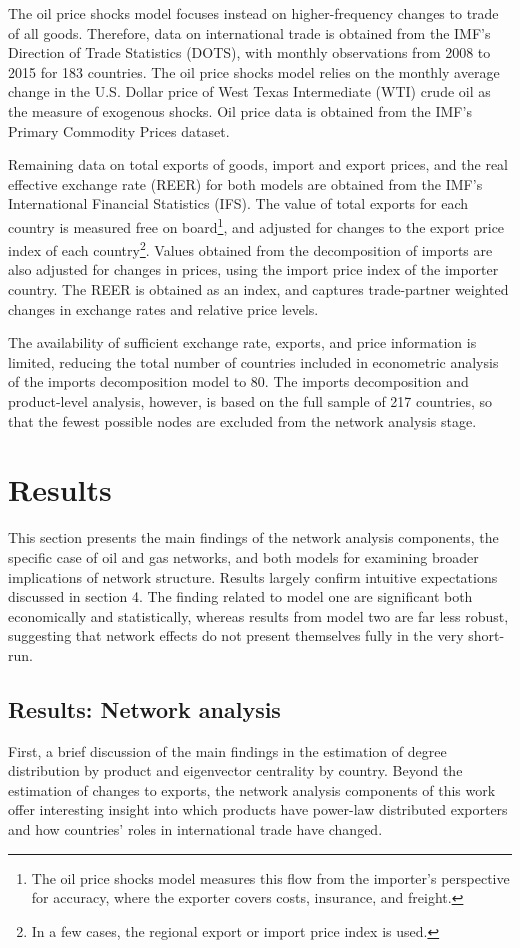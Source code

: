 \documentclass[10pt,letterpaper,pdftex]{article}
\begin{document}
The oil price shocks model focuses instead on higher-frequency changes to trade of all goods. Therefore, data on international trade is obtained from the IMF's Direction of Trade Statistics (DOTS), with monthly observations from 2008 to 2015 for 183 countries. The oil price shocks model relies on the monthly average change in the U.S. Dollar price of West Texas Intermediate (WTI) crude oil as the measure of exogenous shocks. Oil price data is obtained from the IMF's Primary Commodity Prices dataset. 

Remaining data on total exports of goods, import and export prices, and the real effective exchange rate (REER) for both models are obtained from the IMF's International Financial Statistics (IFS). The value of total exports for each country is measured free on board\footnote{The oil price shocks model measures this flow from the importer's perspective for accuracy, where the exporter covers costs, insurance, and freight.}, and adjusted for changes to the export price index of each country\footnote{In a few cases, the regional export or import price index is used.}. Values obtained from the decomposition of imports are also adjusted for changes in prices, using the import price index of the importer country. The REER is obtained as an index, and captures trade-partner weighted changes in exchange rates and relative price levels. 

The availability of sufficient exchange rate, exports, and price information is limited, reducing the total number of countries included in econometric analysis of the imports decomposition model to 80. The imports decomposition and product-level analysis, however, is based on the full sample of 217 countries, so that the fewest possible nodes are excluded from the network analysis stage.

\section{Results} \label{results}
This section presents the main findings of the network analysis components, the specific case of oil and gas networks, and both models for examining broader implications of network structure. Results largely confirm intuitive expectations discussed in section 4. The finding related to model one are significant both economically and statistically, whereas results from model two are far less robust, suggesting that network effects do not present themselves fully in the very short-run.

\subsection{Results: Network analysis} \label{results_nw}
First, a brief discussion of the main findings in the estimation of degree distribution by product and eigenvector centrality by country. Beyond the estimation of changes to exports, the network analysis components of this work offer interesting insight into which products have power-law distributed exporters and how countries' roles in international trade have changed.
\end{document}

